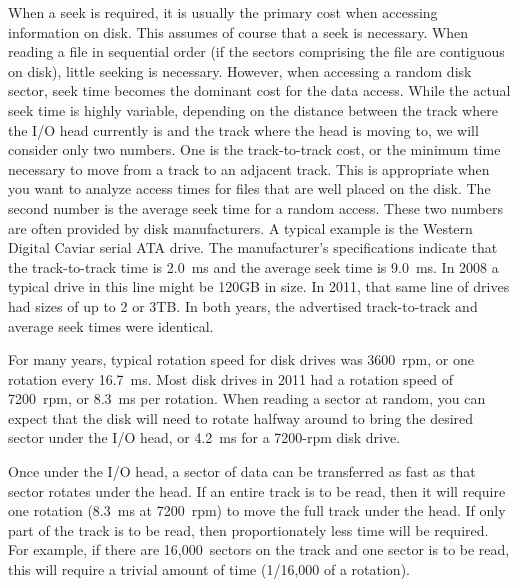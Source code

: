 When a seek is required, it is usually
the primary cost when accessing information on disk.
This assumes of course that a seek is necessary.
When reading a file in sequential order (if the sectors comprising the
file are contiguous on disk), little seeking is necessary.
However, when accessing a random disk sector, seek time becomes the
dominant cost for the data access.
While the actual seek time is highly variable, depending on the
distance between the track where the I/O head currently is and the
track where the head is moving to, we will consider only two numbers.
One is the track-to-track cost, or the minimum time necessary to move
from a track to an adjacent track.
This is appropriate when you want to analyze access times for files
that are well placed on the disk.
The second number is the average seek time for a random access.
These two numbers are often provided by disk manufacturers.
A typical example is the Western Digital Caviar serial ATA drive.
The manufacturer's specifications indicate that the track-to-track
time is 2.0~ms and the average seek time is 9.0~ms.
In 2008 a typical drive in this line might be 120GB in size.
In 2011, that same line of drives had sizes of up to 2 or 3TB.
In both years, the advertised track-to-track and average seek times
were identical.

For many years, typical rotation speed for disk drives was 3600~rpm,
or one rotation every 16.7~ms.
Most disk drives in 2011 had a rotation speed of 7200~rpm, or 8.3~ms
per rotation.
When reading a sector at random, you can expect that the disk will
need to rotate halfway around to bring the desired sector
under the I/O head, or 4.2~ms for a 7200-rpm disk drive. 

Once under the I/O head, a sector of data can be transferred as
fast as that sector rotates under the head.
If an entire track is to be read, then it will require one rotation
(8.3~ms at 7200~rpm) to move the full track under the head.
If only part of the track is to be read, then proportionately less
time will be required.
For example, if there are 16,000~sectors on the track and one sector
is to be read, this will require a trivial amount of time
(1/16,000 of a rotation).

